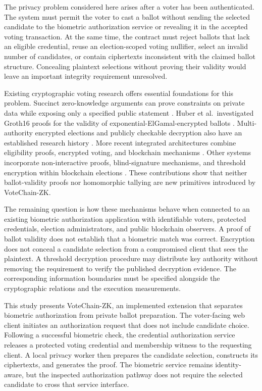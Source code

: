 The privacy problem considered here arises after a voter has been authenticated. The system must permit the voter to cast a ballot without sending the selected candidate to the biometric authorization service or revealing it in the accepted voting transaction. At the same time, the contract must reject ballots that lack an eligible credential, reuse an election-scoped voting nullifier, select an invalid number of candidates, or contain ciphertexts inconsistent with the claimed ballot structure. Concealing plaintext selections without proving their validity would leave an important integrity requirement unresolved.

Existing cryptographic voting research offers essential foundations for this problem. Succinct zero-knowledge arguments can prove constraints on private data while exposing only a specified public statement \citep{groth2016snark}. Huber et al.\ investigated Groth16 proofs for the validity of exponential-ElGamal-encrypted ballots \citep{huber2025ballotvalidity}. Multi-authority encrypted elections and publicly checkable decryption also have an established research history \citep{cramer1997multiauthority}. More recent integrated architectures combine eligibility proofs, encrypted voting, and blockchain mechanisms \citep{alsuwat2026voting,jung2026anonymous}. Other systems incorporate non-interactive proofs, blind-signature mechanisms, and threshold encryption within blockchain elections \citep{wang2024versatile}. These contributions show that neither ballot-validity proofs nor homomorphic tallying are new primitives introduced by VoteChain-ZK.

The remaining question is how these mechanisms behave when connected to an existing biometric authorization application with identifiable voters, protected credentials, election administrators, and public blockchain observers. A proof of ballot validity does not establish that a biometric match was correct. Encryption does not conceal a candidate selection from a compromised client that sees the plaintext. A threshold decryption procedure may distribute key authority without removing the requirement to verify the published decryption evidence. The corresponding information boundaries must be specified alongside the cryptographic relations and the execution measurements.

This study presents VoteChain-ZK, an implemented extension that separates biometric authorization from private ballot preparation. The voter-facing web client initiates an authorization request that does not include candidate choice. Following a successful biometric check, the credential authorization service releases a protected voting credential and membership witness to the requesting client. A local privacy worker then prepares the candidate selection, constructs its ciphertexts, and generates the proof. The biometric service remains identity-aware, but the inspected authorization pathway does not require the selected candidate to cross that service interface.

